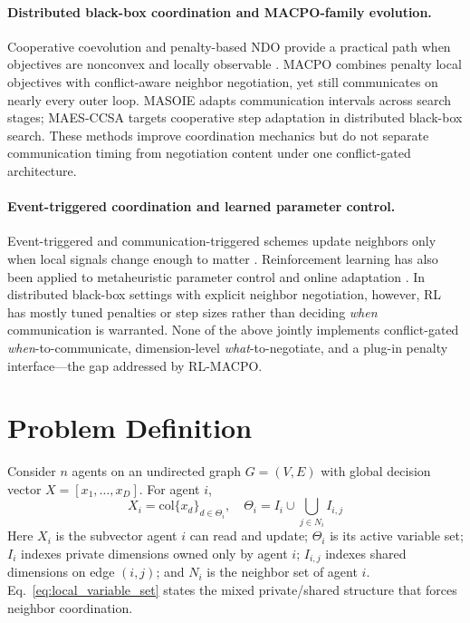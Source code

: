 \documentclass[conference]{IEEEtran}
\begin{document}
\paragraph{Distributed black-box coordination and MACPO-family evolution.}
Cooperative coevolution and penalty-based NDO provide a practical path when objectives are nonconvex and locally observable \cite{ref_potter_dejong,ref_li_yao_survey,ref_cc_dist_accel_2024}. MACPO \cite{ref_macpo} combines penalty local objectives with conflict-aware neighbor negotiation, yet still communicates on nearly every outer loop. MASOIE \cite{ref_masoie_2024} adapts communication intervals across search stages; MAES-CCSA \cite{ref_maes_ccsa_2025} targets cooperative step adaptation in distributed black-box search. These methods improve coordination mechanics but do not separate communication timing from negotiation content under one conflict-gated architecture.

\paragraph{Event-triggered coordination and learned parameter control.}
Event-triggered and communication-triggered schemes update neighbors only when local signals change enough to matter \cite{ref_ndo_stateest_2024,ref_ndo_netcontrol_2024,ref_privacy_dist_opt_2025}. Reinforcement learning has also been applied to metaheuristic parameter control and online adaptation \cite{ref_karafotias_param_control,ref_rl_ea_survey_2024,ref_rl_metaheuristic_2023}. In distributed black-box settings with explicit neighbor negotiation, however, RL has mostly tuned penalties or step sizes rather than deciding \emph{when} communication is warranted. None of the above jointly implements conflict-gated \emph{when}-to-communicate, dimension-level \emph{what}-to-negotiate, and a plug-in penalty interface---the gap addressed by RL-MACPO.

\section{Problem Definition}\label{sec:problem}
Consider $n$ agents on an undirected graph $G=(V,E)$ with global decision vector $X=[x_1,\ldots,x_D]$. For agent $i$,
\begin{equation}
X_i = \mathrm{col}\{x_d\}_{d \in \Theta_i}, \quad \Theta_i = I_i \cup \bigcup_{j \in N_i} I_{i,j}
\label{eq:local_variable_set}
\end{equation}
Here $X_i$ is the subvector agent $i$ can read and update; $\Theta_i$ is its active variable set; $I_i$ indexes private dimensions owned only by agent $i$; $I_{i,j}$ indexes shared dimensions on edge $(i,j)$; and $N_i$ is the neighbor set of agent $i$. Eq.~\eqref{eq:local_variable_set} states the mixed private/shared structure that forces neighbor coordination.
\end{document}
